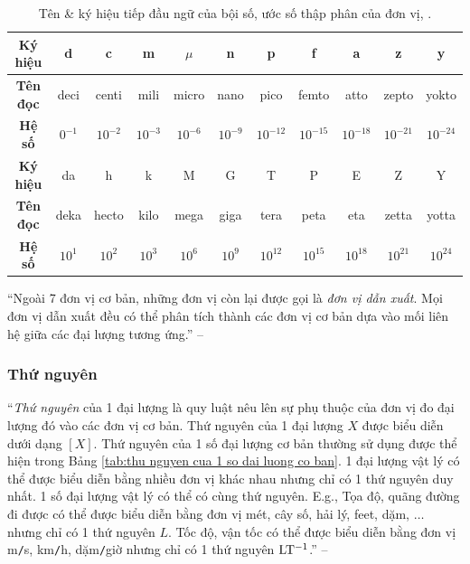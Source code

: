 \documentclass[oneside]{book}
\numberwithin{equation}{section}
\begin{document}
\begin{table}[H]
	\centering
	\begin{tabular}{|c|c|c|c|c|c|c|c|c|c|c|}
		\hline
		\textbf{Ký hiệu} & d & c & m & $\mu$ & n & p & f & a & z & y \\
		\hline
		\textbf{Tên đọc} & deci & centi & mili & micro & nano & pico & femto & atto & zepto & yokto \\
		\hline
		\textbf{Hệ số} & $0^{-1}$ & $10^{-2}$ & $10^{-3}$ & $10^{-6}$ & $10^{-9}$ & $10^{-12}$ & $10^{-15}$ & $10^{-18}$ & $10^{-21}$ & $10^{-24}$ \\
		\hline
		\textbf{Ký hiệu} & da & h & k & M & G & T & P & E & Z & Y \\
		\hline
		\textbf{Tên đọc} & deka & hecto & kilo & mega & giga & tera & peta & eta & zetta & yotta \\
		\hline
		\textbf{Hệ số} & $10^1$ & $10^2$ & $10^3$ & $10^6$ & $10^9$ & $10^{12}$ & $10^{15}$ & $10^{18}$ & $10^{21}$ & $10^{24}$ \\
		\hline
	\end{tabular}
	\caption{Tên \& ký hiệu tiếp đầu ngữ của bội số, ước số thập phân của đơn vị, \cite[Bảng 3.2, p. 16]{SGK_Vat_Ly_10_Chan_Troi_Sang_Tao}.}
	\label{tab:ten & ky hieu tiep dau ngu cua boi so, uoc so thap phan cua don vi}
\end{table}
``Ngoài 7 đơn vị cơ bản, những đơn vị còn lại được gọi là \textit{đơn vị dẫn xuất}. Mọi đơn vị dẫn xuất đều có thể phân tích thành các đơn vị cơ bản dựa vào mối liên hệ giữa các đại lượng tương ứng.'' -- \cite[p. 16]{SGK_Vat_Ly_10_Chan_Troi_Sang_Tao}

\subsubsection{Thứ nguyên}
``\textit{Thứ nguyên} của 1 đại lượng là quy luật nêu lên sự phụ thuộc của đơn vị đo đại lượng đó vào các đơn vị cơ bản. Thứ nguyên của 1 đại lượng $X$ được biểu diễn dưới dạng $[X]$. Thứ nguyên của 1 số đại lượng cơ bản thường sử dụng được thể hiện trong Bảng \ref{tab:thu nguyen cua 1 so dai luong co ban}. 1 đại lượng vật lý có thể được biểu diễn bằng nhiều đơn vị khác nhau nhưng chỉ có 1 thứ nguyên duy nhất. 1 số đại lượng vật lý có thể có cùng thứ nguyên. E.g., Tọa độ, quãng đường đi được có thể được biểu diễn bằng đơn vị mét, cây số, hải lý, feet, dặm, $\ldots$ nhưng chỉ có 1 thứ nguyên $L$. Tốc độ, vận tốc có thể được biểu diễn bằng đơn vị m\texttt{/}s, km\texttt{/}h, dặm\texttt{/}giờ nhưng chỉ có 1 thứ nguyên $\rm LT^{-1}$.'' -- \cite[p. 16]{SGK_Vat_Ly_10_Chan_Troi_Sang_Tao}
\end{document}
